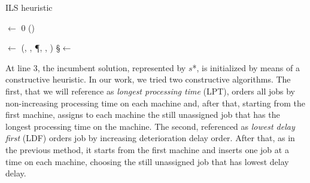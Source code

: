\documentclass[a4paper,11pt]{article}
\begin{document}
\IncMargin{1em}
\begin{algorithm}[H]
\tiny
\caption{ILS heuristic}\label{ILS}
\SetAlgoLined



\Input{\JJ, \MM, \P, \D, \T}
\Output{\SS}

\NonImproveIters$\leftarrow$ 0 \;
\StartTimer(\Time)

\SS $\leftarrow$ \ConstructiveHeuristic(\JJ, \MM, \P, \D, \T)\;
\S $\leftarrow$ \SS

\end{algorithm}
\DecMargin{1em}



At line 3, the incumbent solution, represented by $s$*, is initialized by means of a constructive heuristic. In our work, we tried two constructive algorithms. The first, that we will reference as \emph{ longest processing time} (LPT), orders all jobs by non-increasing processing time on each machine and, after that, starting from the first machine, assigns to each machine the still unassigned job that has the longest processing time on the machine. The second, referenced as \emph{lowest delay first} (LDF) orders job by increasing deterioration delay order. After that, as in the previous method, it starts from the first machine and inserts one job at a time on each machine, choosing the still unassigned job that has lowest delay delay. 
\end{document}
